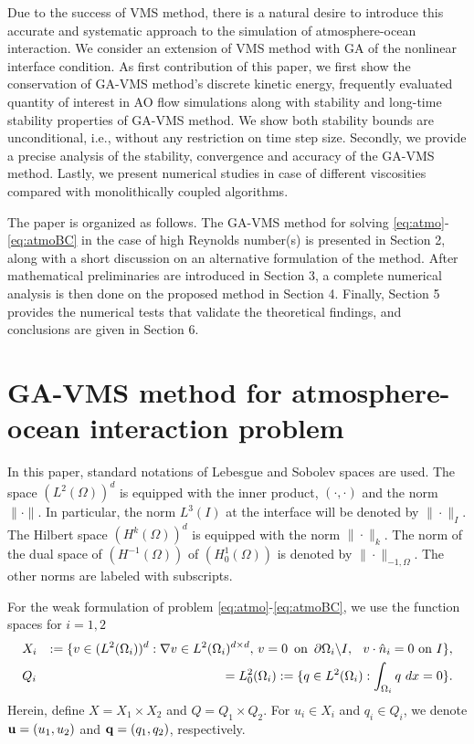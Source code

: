 \documentclass[10pt]{article}%
\numberwithin{equation}{section}
\begin{document}
Due to the success of VMS method, there is a natural desire to introduce this accurate and systematic approach to the simulation of atmosphere-ocean interaction. We consider an extension of VMS method with GA of the nonlinear interface condition. As first contribution of this paper, we first show the conservation of GA-VMS method's discrete kinetic energy, frequently evaluated quantity of interest in AO flow simulations along with stability and long-time stability properties of GA-VMS method. We show both stability bounds are unconditional, i.e., without any restriction on time step size. Secondly, we provide a precise analysis of the stability, convergence and accuracy of the GA-VMS method. Lastly, we present numerical studies in case of different viscosities compared with monolithically coupled algorithms.

The paper is organized as follows. The GA-VMS method for solving \eqref{eq:atmo}-\eqref{eq:atmoBC} in the case of high Reynolds number(s) is presented in Section 2, along with a short discussion on an alternative formulation of the method. After mathematical preliminaries are introduced in Section 3, a complete  numerical analysis is then done on the proposed method in Section 4. Finally, Section 5 provides the numerical tests that validate the theoretical findings, and conclusions are given in Section 6.



\section{GA-VMS method for atmosphere-ocean interaction problem }

In this paper, standard notations of Lebesgue and Sobolev spaces are used. The space $(L^2(\Omega))^d$ is equipped with the inner product, $(\cdot,\cdot)$ and the norm $\|\cdot\|$. In particular, the norm $L^3(I)$ at the interface will be denoted by $\|\cdot\|_I$. The Hilbert space $(H^k(\Omega))^d$ is equipped with the norm $\|\cdot\|_k$. The norm of the dual space of $(H^{-1}(\Omega))$ of $(H_0^1(\Omega))$ is denoted by $\|\cdot\|_{-1,\Omega}$. The other norms are labeled with subscripts.

For the weak formulation of problem \eqref{eq:atmo}-\eqref{eq:atmoBC}, we use the function spaces for $i=1,2$
\begin{eqnarray}
&X_{i}&  :=\{v\in (L^2(\Omega_{i}))^d:\nabla v \in L^2(\Omega_{i})^{d\times d}, \, v= 0\,\mbox{  on  }\,\partial \Omega{_{i} \backslash I, \hspace{0.1in} v\cdot \hat{n}_i = 0 \mbox{  on  } I}\},
\nonumber
\\
&Q_{i}& = L_0^2(\Omega_{i}) := \{q \in L^2(\Omega_{i}): \int_{\Omega_{i}} q \ dx = 0\}.  \nonumber
\end{eqnarray}
Herein, define $X=X_1\times X_2$  and $Q=Q_1\times Q_2$. For $u_i\in X_i$ and $q_i\in Q_i$, we denote ${\bf u}=(u_1,u_2)$ and ${\bf q}=(q_1,q_2)$, respectively.
\end{document}
